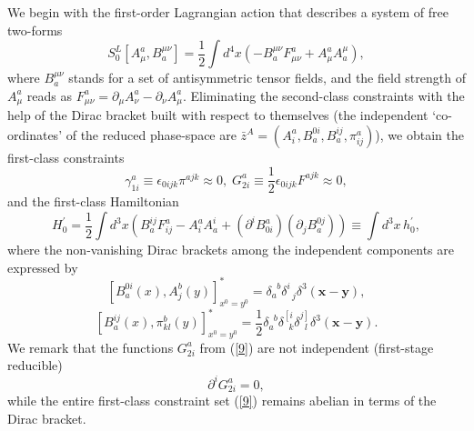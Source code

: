 \documentclass[a4paper,12pt]{article}
\begin{document}
We begin with the first-order Lagrangian action that describes a system of
free two-forms 
\begin{equation}
S_{0}^{L}\left[ A_{\mu }^{a},B_{a}^{\mu \nu }\right] =\frac{1}{2}\int
d^{4}x\left( -B_{a}^{\mu \nu }F_{\mu \nu }^{a}+A_{\mu }^{a}A_{a}^{\mu
}\right) ,  \label{1}
\end{equation}
where $B_{a}^{\mu \nu }$ stands for a set of antisymmetric tensor fields,
and the field strength of $A_{\mu }^{a}$ reads as $F_{\mu \nu }^{a}=\partial
_{\mu }A_{\nu }^{a}-\partial _{\nu }A_{\mu }^{a}$. Eliminating the
second-class constraints with the help of the Dirac bracket built with
respect to themselves (the independent `co-ordinates' of the reduced
phase-space are $\bar{z}^{A}=\left( A_{i}^{a},B_{a}^{0i},B_{a}^{ij},\pi
_{ij}^{a}\right) $), we obtain the first-class constraints 
\begin{equation}
\gamma _{1i}^{a}\equiv \epsilon _{0ijk}\pi ^{ajk}\approx
0,\;G_{2i}^{a}\equiv \frac{1}{2}\epsilon _{0ijk}F^{ajk}\approx 0,  \label{9}
\end{equation}
and the first-class Hamiltonian 
\begin{equation}
H_{0}^{\prime }=\frac{1}{2}\int d^{3}x\left(
B_{a}^{ij}F_{ij}^{a}-A_{i}^{a}A_{a}^{i}+\left( \partial
^{i}B_{0i}^{a}\right) \left( \partial _{j}B_{a}^{0j}\right) \right) \equiv
\int d^{3}x\,h_{0}^{\prime },  \label{10}
\end{equation}
where the non-vanishing Dirac brackets among the independent components are
expressed by 
\begin{equation}
\left[ B_{a}^{0i}\left( x\right) ,A_{j}^{b}\left( y\right) \right]
_{x^{0}=y^{0}}^{*}=\delta _{a}^{\;\;b}\delta _{\;\;j}^{i}\delta ^{3}\left( 
\mathbf{x}-\mathbf{y}\right) ,  \label{7}
\end{equation}
\begin{equation}
\left[ B_{a}^{ij}\left( x\right) ,\pi _{kl}^{b}\left( y\right) \right]
_{x^{0}=y^{0}}^{*}=\frac{1}{2}\delta _{a}^{\;\;b}\delta _{\;\;k}^{\left[
i\right. }\delta _{\;\;l}^{\left. j\right] }\delta ^{3}\left( \mathbf{x}-%
\mathbf{y}\right) .  \label{8}
\end{equation}
We remark that the functions $G_{2i}^{a}$ from (\ref{9}) are not independent
(first-stage reducible) 
\begin{equation}
\partial ^{i}G_{2i}^{a}=0,  \label{11}
\end{equation}
while the entire first-class constraint set (\ref{9}) remains abelian in
terms of the Dirac bracket.
\end{document}
